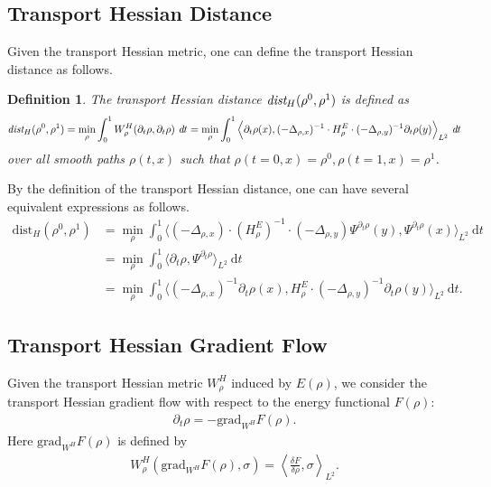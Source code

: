 \documentclass[11pt]{book}
\newtheorem{definition}[theorem]{Definition}
\begin{document}
\subsection{Transport Hessian Distance}

Given the transport Hessian metric, one can define the transport Hessian distance as follows.
\begin{definition}
The transport Hessian distance $\emph{dist}_H(\rho^0,\rho^1)$ is defined as
\begin{align}
\emph{dist}_H(\rho^0,\rho^1) = \min_{\rho} \int_0^1 W_{\rho}^H(\partial_t\rho,\partial_t\rho)\ \emph{d}t = 
\min_{\rho} \int_0^1 \Big\langle \partial_t\rho(x), (-\Delta_{\rho,x})^{-1}\cdot H_{\rho}^E \cdot(-\Delta_{\rho,y})^{-1}\partial_t\rho(y) \Big\rangle_{L^2}\ \emph{d}t
\end{align}
over all smooth paths $\rho(t,x)$ such that $\rho(t=0,x) = \rho^0, \rho(t=1,x) = \rho^1$.
\end{definition}

By the definition of the transport Hessian distance, one can have several equivalent expressions as follows.
\begin{align}
\text{dist}_H(\rho^0,\rho^1)  &=
\min_{\rho} \int_0^1 \Big\langle (-\Delta_{\rho,x})\cdot(H_{\rho}^E)^{-1}\cdot (-\Delta_{\rho,y})\Psi^{\partial_t\rho}(y), \Psi^{\partial_t\rho}(x) \Big\rangle_{L^2}\ \text{d}t \\
& = \min_{\rho} \int_0^1 \Big\langle \partial_t\rho, \Psi^{\partial_t\rho} \Big\rangle_{L^2} \ \text{d}t \\
& = \min_{\rho} \int_0^1 \Big\langle (-\Delta_{\rho,x})^{-1}\partial_t\rho(x), H_{\rho}^E\cdot(-\Delta_{\rho,y})^{-1}\partial_t\rho(y) \Big\rangle_{L^2} \ \text{d}t .
\end{align}

\subsection{Transport Hessian Gradient Flow}

Given the transport Hessian metric $W_{\rho}^H$ induced by $E(\rho)$, we consider the transport Hessian gradient flow with respect to the energy functional $F(\rho)$:
\begin{align}
\partial_t \rho = -\text{grad}_{W^H}F(\rho).
\end{align}
Here $\text{grad}_{W^H}F(\rho)$ is defined by
\begin{align}\label{eqn:def_grad_WH}
W_{\rho}^H(\text{grad}_{W^H}F(\rho),\sigma) = \left\langle  \frac{\delta F}{\delta \rho}, \sigma \right\rangle_{L^2}.
\end{align}
\end{document}
